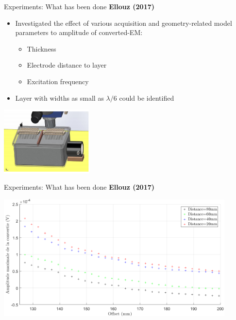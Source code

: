 \documentclass[utf8]{beamer} \usetheme{lfcr} %
\begin{document}
\begin{frame}{Experiments: What has been done}
  {\textbf{Ellouz (2017)}}
  \vspace*{-1cm}
  \begin{block}{}
  \begin{itemize}
    \item {Investigated the effect of various acquisition and geometry-related model parameters to amplitude of converted-EM:

      \begin{itemize}
        \item Thickness
        \item Electrode distance to layer
        \item Excitation frequency

      \end{itemize}
      }
      \item Layer with widths as small as $\lambda/6$ could be identified
  \end{itemize}
  \end{block}

  \vspace*{1.5cm}

  \begin{block}{}
  \includegraphics[width=0.35\textwidth]{ellouz2017_3}
  \end{block}

\end{frame}
%
\begin{frame}{Experiments: What has been done}
  {\textbf{Ellouz (2017)}}

  \begin{center}
    \vspace*{2.5cm}
    \includegraphics[width=0.9\textwidth]{ellouz2017_1}%
  \end{center}

\end{frame}
\end{document}
